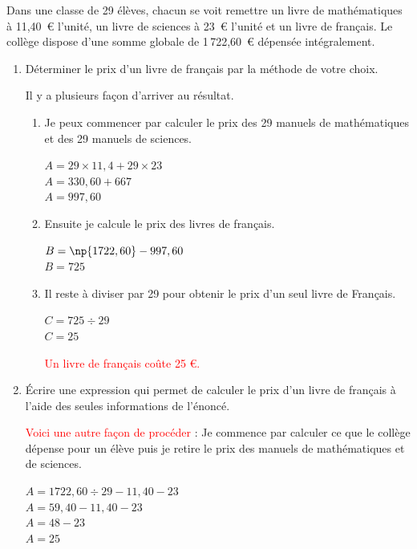 \documentclass[a4paper]{book}
\begin{document}
{    \begin{exercice}
        Dans une classe de 29 élèves, chacun se voit remettre un livre de mathématiques à 11,40~\euro \; l'unité, un livre de sciences à 23~\euro \; l'unité et un livre de français. Le collège dispose d'une somme globale de 1\,722,60~\euro \; dépensée intégralement.

        \begin{enumerate}
            \item Déterminer le prix d'un livre de français par la méthode de votre choix.

            Il y a plusieurs façon d'arriver au résultat.
            \begin{enumerate}
                \item Je peux commencer par calculer le prix des 29 manuels de mathématiques et des 29 manuels de sciences.

                $A=29\times 11,4+29\times23$\\
                $A=330,60+667$\\
                $A=997,60$

                \item Ensuite je calcule le prix des livres de français.

                $B=\np{1722,60}-997,60$\\
                $B=725$

                \item Il reste à diviser par 29 pour obtenir le prix d'un seul livre de Français.

                $C=725\div29$\\
                $C=25$

                \textcolor{red}{Un livre de français coûte 25 \euro.}
                
            \end{enumerate}

            \item Écrire une expression qui permet de calculer le prix d'un livre de français à l'aide des seules informations de l'énoncé.

            \textcolor{red}{Voici une autre façon de procéder} : Je commence par calculer ce que le collège dépense pour un élève puis je retire le prix des manuels de mathématiques et de sciences.

            $A = 1722,60\div29-11,40-23 $\\
            $A = 59,40-11,40-23$\\
            $A = 48 - 23$\\
            $A=25$


\end{enumerate}
\end{exercice}}
\end{document}
